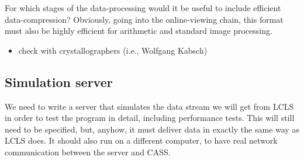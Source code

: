 \documentclass[11pt,a4paper,oneside]{article}
\begin{document}
For which stages of the data-processing would it be useful to include efficient data-compression?
Obviously, going into the online-viewing chain, this format must also be highly efficient for
arithmetic and standard image processing.
\begin{itemize}
\item check with crystallographers (i.e., Wolfgang Kabsch)
\end{itemize}


\subsection{Simulation server}
\label{sec:simulation-server}

We need to write a server that simulates the data stream we will get from LCLS in order to test the
program in detail, including performance tests. This will still need to be specified, but, anyhow,
it must deliver data in exactly the same way as LCLS does. It should also run on a different
computer, to have real network communication between the server and CASS.


\begin{flushright}
\end{flushright}
\end{document}
